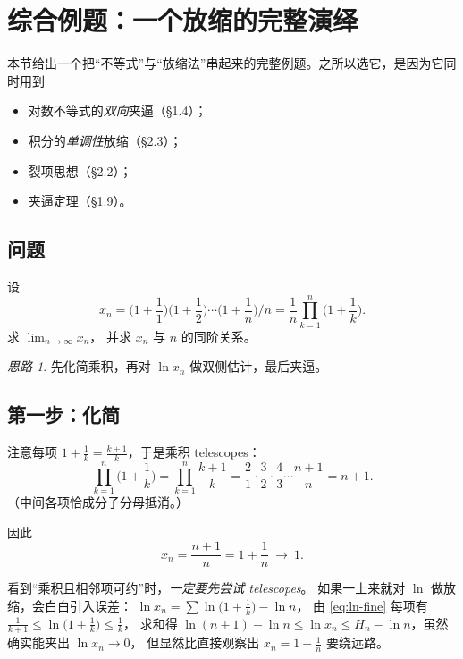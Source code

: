 \documentclass[11pt,a4paper]{ctexart}
\theoremstyle{definition}
\theoremstyle{remark}
\newtheorem*{proofidea}{思路}
\begin{document}
\newpage

\section{综合例题：一个放缩的完整演绎}

本节给出一个把“不等式”与“放缩法”串起来的完整例题。之所以选它，是因为它同时用到
\begin{itemize}
  \item 对数不等式的\emph{双向}夹逼（\S 1.4）；
  \item 积分的\emph{单调性}放缩（\S 2.3）；
  \item 裂项思想（\S 2.2）；
  \item 夹逼定理（\S 1.9）。
\end{itemize}

\subsection{问题}

\begin{keybox}[例题]
设
\[
  x_n=\Big(1+\frac11\Big)\Big(1+\frac12\Big)\cdots\Big(1+\frac1n\Big)\Big/n
  =\frac{1}{n}\prod_{k=1}^{n}\Big(1+\frac1k\Big).
\]
求 $\displaystyle\lim_{n\to\infty}x_n$，
并求 $x_n$ 与 $n$ 的同阶关系。
\end{keybox}

\begin{proofidea}
先化简乘积，再对 $\ln x_n$ 做双侧估计，最后夹逼。
\end{proofidea}

\subsection{第一步：化简}

注意每项 $1+\frac1k=\frac{k+1}{k}$，于是乘积 telescopes：
\[
  \prod_{k=1}^{n}\Big(1+\frac1k\Big)
  =\prod_{k=1}^{n}\frac{k+1}{k}
  =\frac{2}{1}\cdot\frac32\cdot\frac43\cdots\frac{n+1}{n}
  =n+1 .
\]
（中间各项恰成分子分母抵消。）

因此
\begin{equation}\label{eq:xn-simple}
  x_n=\frac{n+1}{n}=1+\frac1n\ \longrightarrow\ 1 .
\end{equation}

\begin{tipbox}
看到“乘积且相邻项可约”时，\emph{一定要先尝试 telescopes}。
如果一上来就对 $\ln$ 做放缩，会白白引入误差：
$\ln x_n=\sum\ln\big(1+\frac1k\big)-\ln n$，
由 \eqref{eq:ln-fine} 每项有 $\frac{1}{k+1}\le\ln\big(1+\frac1k\big)\le\frac1k$，
求和得 $\ln(n+1)-\ln n\le\ln x_n\le H_n-\ln n$，虽然确实能夹出 $\ln x_n\to0$，
但显然比直接观察出 $x_n=1+\frac1n$ 要绕远路。
\end{tipbox}
\end{document}
